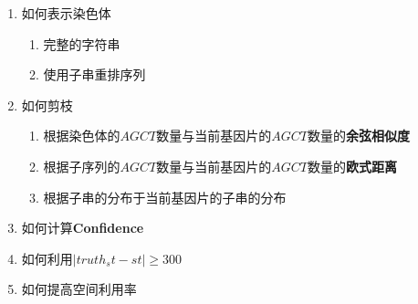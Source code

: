 \documentclass[hyperref,UTF8]{ctexart}
\theoremstyle{definition}
\theoremstyle{remark}
\numberwithin{equation}{subsection}
\newcommand{\Emph}{\textbf}
\begin{document}
	\begin{enumerate}
	
		\item 如何表示染色体
		
		\begin{enumerate}[(1)]
		
			\item 完整的字符串
			
			\item 使用子串重排序列
			
		\end{enumerate}
		
		\item 如何剪枝
		
		\begin{enumerate}[(1)]
		
			\item 根据染色体的$AGCT$数量与当前基因片的$AGCT$数量的\Emph{余弦相似度}
			
			\item 根据子序列的$AGCT$数量与当前基因片的$AGCT$数量的\Emph{欧式距离}
			
			\item 根据子串的分布于当前基因片的子串的分布
		
		\end{enumerate}
		
		\item 如何计算\Emph{Confidence}
		
		\item 如何利用$|truth_st-st| \ge 300$
		
		\item 如何提高空间利用率
	
	\end{enumerate}
	
\end{document}
